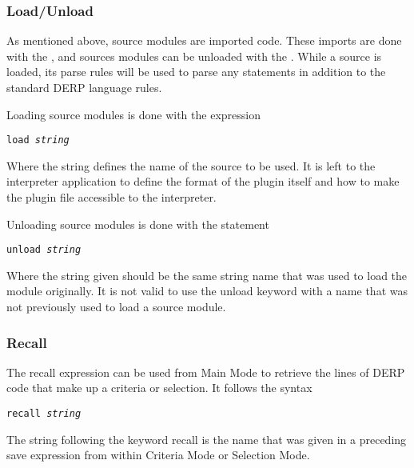 \subsubsection{Load/Unload}
As mentioned above, source modules are imported code. These imports are done with the ,
and sources modules can be unloaded with the . While a source is loaded, its parse
rules will be used to parse any statements in addition to the standard DERP language rules.

Loading source modules is done with the expression
\begin{description}[labelindent=1cm,leftmargin=\onelen,labelwidth=1cm]
     \texttt{load \textit{string}}\\
\end{description}

Where the string defines the name of the source to be used. It is left to the interpreter application to define
the format of the plugin itself and how to make the plugin file accessible to the interpreter.

Unloading source modules is done with the statement
\begin{description}[labelindent=1cm,leftmargin=\onelen,labelwidth=1cm]
     \texttt{unload \textit{string}}\\
\end{description}

Where the string given should be the same string name that was used to load the module originally.
It is not valid to use the unload keyword with a name that was not previously used to load a source module.



\subsubsection{Recall}
The recall expression can be used from Main Mode to retrieve the lines of DERP code that make up a
criteria or selection. It follows the syntax
\begin{description}[labelindent=1cm,leftmargin=\onelen,labelwidth=1cm]
     \texttt{recall \textit{string}}\\
\end{description}

The string following the keyword recall is the name that was given in a preceding save expression from
within Criteria Mode or Selection Mode.

